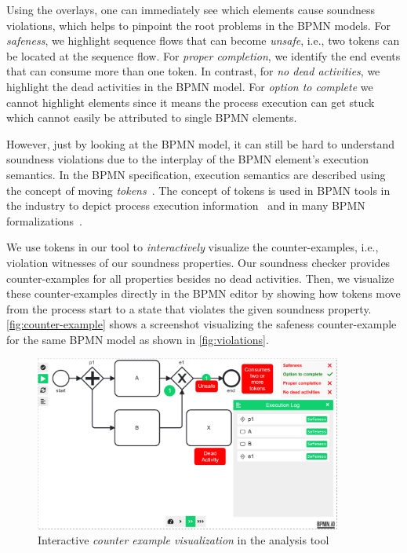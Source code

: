 \documentclass[runningheads]{llncs}
\begin{document}
Using the overlays, one can immediately see which elements cause soundness violations, which helps to pinpoint the root problems in the BPMN models.
For \textit{safeness}, we highlight sequence flows that can become \textit{unsafe}, i.e., two tokens can be located at the sequence flow.
For \textit{proper completion}, we identify the end events that can consume more than one token.
In contrast, for \textit{no dead activities}, we highlight the dead activities in the BPMN model.
For \textit{option to complete} we cannot highlight elements since it means the process execution can get stuck which cannot easily be attributed to single BPMN elements.

However, just by looking at the BPMN model, it can still be hard to understand soundness violations due to the interplay of the BPMN element's execution semantics.
In the BPMN specification, execution semantics are described using the concept of moving \textit{tokens}~\cite{objectmanagementgroupBusinessProcessModel2013}.
The concept of tokens is used in BPMN tools in the industry to depict process execution information~\cite{camundaservicesgmbhBpmnjsTokenSimulation2024} and in many BPMN formalizations~\cite{corradiniFormalApproachAnalysis2021,houhouFirstOrderLogicVerification2022,krauterFormalizationAnalysisBPMN2023}.

We use tokens in our tool to \textit{interactively} visualize the counter-examples, i.e., violation witnesses of our soundness properties.
Our soundness checker provides counter-examples for all properties besides no dead activities.
Then, we visualize these counter-examples directly in the BPMN editor by showing how tokens move from the process start to a state that violates the given soundness property.
\autoref{fig:counter-example} shows a screenshot visualizing the safeness counter-example for the same BPMN model as shown in \autoref{fig:violations}.

\begin{figure}[ht]
	\centering
	\includegraphics[width=0.9\textwidth]{images/counter-example}
	\caption{Interactive \textit{counter example visualization} in the analysis tool}
	\label{fig:counter-example}
\end{figure}
\end{document}
